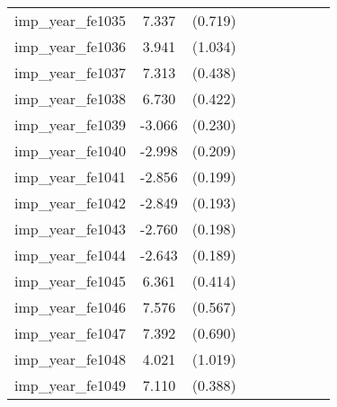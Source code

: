 {\begin{tabular}{l*{4}{cc}}
imp\_year\_fe1035&    7.337\sym{***}&  (0.719)&                  &         &                  &         &                  &         \\
imp\_year\_fe1036&    3.941\sym{***}&  (1.034)&                  &         &                  &         &                  &         \\
imp\_year\_fe1037&    7.313\sym{***}&  (0.438)&                  &         &                  &         &                  &         \\
imp\_year\_fe1038&    6.730\sym{***}&  (0.422)&                  &         &                  &         &                  &         \\
imp\_year\_fe1039&   -3.066\sym{***}&  (0.230)&                  &         &                  &         &                  &         \\
imp\_year\_fe1040&   -2.998\sym{***}&  (0.209)&                  &         &                  &         &                  &         \\
imp\_year\_fe1041&   -2.856\sym{***}&  (0.199)&                  &         &                  &         &                  &         \\
imp\_year\_fe1042&   -2.849\sym{***}&  (0.193)&                  &         &                  &         &                  &         \\
imp\_year\_fe1043&   -2.760\sym{***}&  (0.198)&                  &         &                  &         &                  &         \\
imp\_year\_fe1044&   -2.643\sym{***}&  (0.189)&                  &         &                  &         &                  &         \\
imp\_year\_fe1045&    6.361\sym{***}&  (0.414)&                  &         &                  &         &                  &         \\
imp\_year\_fe1046&    7.576\sym{***}&  (0.567)&                  &         &                  &         &                  &         \\
imp\_year\_fe1047&    7.392\sym{***}&  (0.690)&                  &         &                  &         &                  &         \\
imp\_year\_fe1048&    4.021\sym{***}&  (1.019)&                  &         &                  &         &                  &         \\
imp\_year\_fe1049&    7.110\sym{***}&  (0.388)&                  &         &                  &         &                  &         \\

\end{tabular}}
